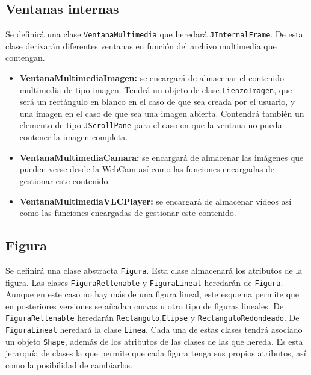 \subsection{Ventanas internas}
Se definirá una clase \texttt{VentanaMultimedia} que heredará \texttt{JInternalFrame}. De esta clase derivarán diferentes ventanas en función del archivo multimedia que contengan.
\begin{itemize}
\item{\textbf{VentanaMultimediaImagen:} se encargará de almacenar el contenido multimedia de tipo imagen. Tendrá un objeto de clase \texttt{LienzoImagen}, que será un rectángulo en blanco en el caso de que sea creada por el usuario, y una imagen en el caso de que sea una imagen abierta. Contendrá también un elemento de tipo 	\texttt{JScrollPane} para el caso en que la ventana no pueda contener la imagen completa.}
\item{\textbf{VentanaMultimediaCamara:} se encargará de almacenar las imágenes que pueden verse desde la WebCam así como las funciones encargadas de gestionar este contenido.}
\item{\textbf{VentanaMultimediaVLCPlayer:} se encargará de almacenar vídeos así como las funciones encargadas de gestionar este contenido.}
\end{itemize}
\subsection{Figura}
Se definirá una clase abstracta \texttt{Figura}. Esta clase almacenará los atributos de la figura. Las clases \texttt{FiguraRellenable} y \texttt{FiguraLineal} heredarán de \texttt{Figura}. Aunque en este caso no hay más de una figura lineal, este esquema permite que en posteriores versiones se añadan curvas u otro tipo de figuras lineales. De \texttt{FiguraRellenable} heredarán \texttt{Rectangulo},\texttt{Elipse} y \texttt{RectanguloRedondeado}. De \texttt{FiguraLineal} heredará la clase \texttt{Linea}. Cada una de estas clases tendrá asociado un objeto \texttt{Shape}, además de los atributos de las clases de las que hereda.\vskip0.3cm
Es esta jerarquía de clases la que permite que cada figura tenga sus propios atributos, así como la posibilidad de cambiarlos.
